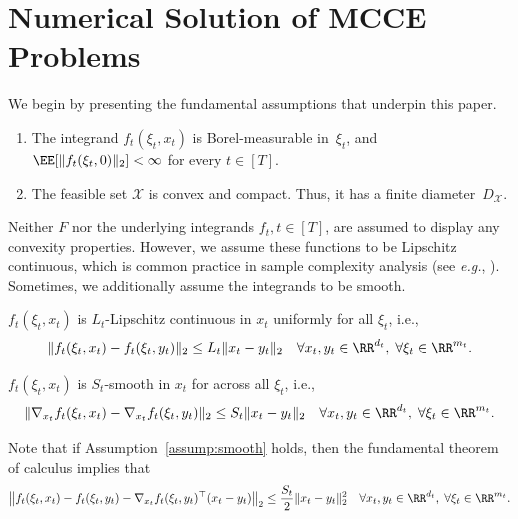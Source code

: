\documentclass[11pt]{article}
\begin{document}

\section{Numerical Solution of MCCE Problems}
\label{sec:mcco_estimation}

We begin by presenting the fundamental assumptions that underpin this paper.
\begin{assumption} 
\label{assump:general}
\leavevmode\begin{enumerate}[label=(\roman*)]
    \item The integrand $f_t(\xi_t,x_t)$ is Borel-measurable in~$\xi_t$, and $\EE[\|f_t(\xi_t,0)\|_2]<\infty$ for every $t\in[T]$. 
    \item The feasible set $\mathcal{X}$ is convex and compact. Thus, it has a finite diameter~$D_\mathcal{X}$.
\end{enumerate}
\end{assumption}

Neither $F$ nor the underlying integrands $f_t, t\in[T]$, are assumed to display any convexity properties. However, we assume these functions to be Lipschitz continuous, which is common practice in sample complexity analysis (see {\em e.g.}, \citep{shapiro2005complexity}). Sometimes, we additionally assume the integrands to be smooth. 

\begin{assumption} 
\label{assump:lipschitz}
   $f_t(\xi_t,x_t)$ is $L_t$-Lipschitz continuous in $x_t$ uniformly for all $\xi_t$, i.e.,
    $$ \|f_t(\xi_t,x_t) -  f_t(\xi_t,y_t)\|_2 \leq L_t\|x_t-y_t\|_2 \quad \forall x_t,y_t \in \RR^{d_t},\; \forall \xi_t\in\RR^{m_t}.$$
\end{assumption}

\begin{assumption}[Smoothness] 
\label{assump:smooth}
 $f_t(\xi_t,x_t)$ is $S_t$-smooth in $x_t$ for across all $\xi_{t}$, i.e., 
  $$\|\nabla_{x_t} f_t(\xi_t,x_t) - \nabla_{x_t} f_t(\xi_t,y_t) \|_2\leq S_t\|x_t-y_t\|_2\quad \forall x_t,y_t\in \RR^{d_t},\; \forall \xi_t\in\RR^{m_t}.$$
\end{assumption}
Note that if Assumption~\ref{assump:smooth} holds, then the fundamental theorem of calculus implies that 
\begin{align}\label{eq:inequality_for_smooth_funs}
    \left\|f_t(\xi_t,x_t)-f_t(\xi_t,y_t)-\nabla_{x_t} f_t(\xi_t,y_t)^\top(x_t-y_t) \right\|_2\leq \frac{S_{t}}{2}\|x_t-y_t\|_2^2\quad \forall x_t,y_t\in\RR^{d_t},\;\forall \xi_t\in\RR^{m_t}.
\end{align}
\end{document}
